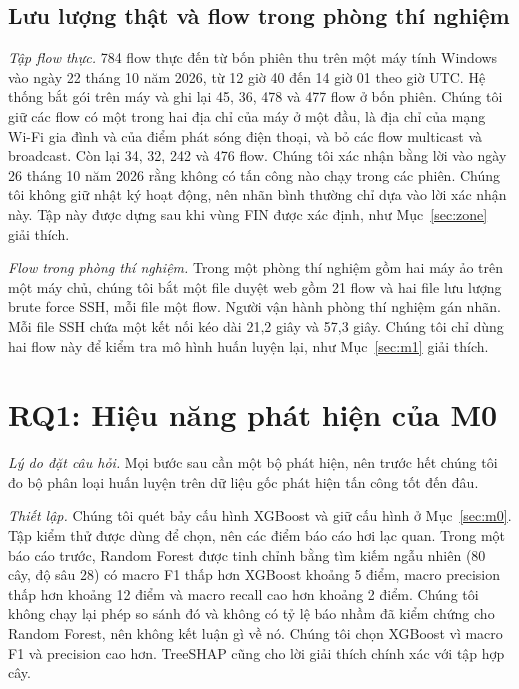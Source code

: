 \documentclass[conference]{IEEEtran}
\begin{document}
\subsection{Lưu lượng thật và flow trong phòng thí nghiệm}
\textit{Tập flow thực.} 784 flow thực đến từ bốn phiên thu trên một máy tính Windows vào ngày 22 tháng 10 năm 2026, từ 12 giờ 40 đến 14 giờ 01 theo giờ UTC. Hệ thống bắt gói trên máy và ghi lại 45, 36, 478 và 477 flow ở bốn phiên. Chúng tôi giữ các flow có một trong hai địa chỉ của máy ở một đầu, là địa chỉ của mạng Wi-Fi gia đình và của điểm phát sóng điện thoại, và bỏ các flow multicast và broadcast. Còn lại 34, 32, 242 và 476 flow. Chúng tôi xác nhận bằng lời vào ngày 26 tháng 10 năm 2026 rằng không có tấn công nào chạy trong các phiên. Chúng tôi không giữ nhật ký hoạt động, nên nhãn bình thường chỉ dựa vào lời xác nhận này. Tập này được dựng sau khi vùng FIN được xác định, như Mục~\ref{sec:zone} giải thích.

\textit{Flow trong phòng thí nghiệm.} Trong một phòng thí nghiệm gồm hai máy ảo trên một máy chủ, chúng tôi bắt một file duyệt web gồm 21 flow và hai file lưu lượng brute force SSH, mỗi file một flow. Người vận hành phòng thí nghiệm gán nhãn. Mỗi file SSH chứa một kết nối kéo dài 21,2 giây và 57,3 giây. Chúng tôi chỉ dùng hai flow này để kiểm tra mô hình huấn luyện lại, như Mục~\ref{sec:m1} giải thích.

\section{RQ1: Hiệu năng phát hiện của M0}
\textit{Lý do đặt câu hỏi.} Mọi bước sau cần một bộ phát hiện, nên trước hết chúng tôi đo bộ phân loại huấn luyện trên dữ liệu gốc phát hiện tấn công tốt đến đâu.

\textit{Thiết lập.} Chúng tôi quét bảy cấu hình XGBoost và giữ cấu hình ở Mục~\ref{sec:m0}. Tập kiểm thử được dùng để chọn, nên các điểm báo cáo hơi lạc quan. Trong một báo cáo trước, Random Forest được tinh chỉnh bằng tìm kiếm ngẫu nhiên (80 cây, độ sâu 28) có macro F1 thấp hơn XGBoost khoảng 5 điểm, macro precision thấp hơn khoảng 12 điểm và macro recall cao hơn khoảng 2 điểm. Chúng tôi không chạy lại phép so sánh đó và không có tỷ lệ báo nhầm đã kiểm chứng cho Random Forest, nên không kết luận gì về nó. Chúng tôi chọn XGBoost vì macro F1 và precision cao hơn. TreeSHAP cũng cho lời giải thích chính xác với tập hợp cây.
\end{document}
